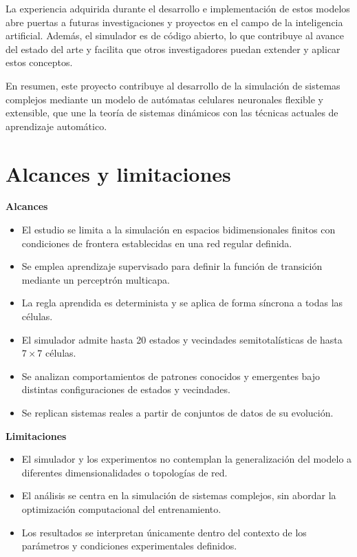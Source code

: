 La experiencia adquirida durante el desarrollo e implementación de estos modelos abre puertas a futuras investigaciones y proyectos en el campo de la inteligencia artificial. Además, el simulador es de código abierto, lo que contribuye al avance del estado del arte y facilita que otros investigadores puedan extender y aplicar estos conceptos.

En resumen, este proyecto contribuye al desarrollo de la simulación de sistemas complejos mediante un modelo de autómatas celulares neuronales flexible y extensible, que une la teoría de sistemas dinámicos con las técnicas actuales de aprendizaje automático.

\section{Alcances y limitaciones}

\textbf{Alcances}

\begin{itemize}
	
	\item El estudio se limita a la simulación en espacios bidimensionales finitos con condiciones de frontera establecidas en una red regular definida.
	
	\item Se emplea aprendizaje supervisado para definir la función de transición mediante un perceptrón multicapa.
	
	\item La regla aprendida es determinista y se aplica de forma síncrona a todas las células.
	
	\item El simulador admite hasta 20 estados y vecindades semitotalísticas de hasta $7 \times 7$ células.
	
	\item Se analizan comportamientos de patrones conocidos y emergentes bajo distintas configuraciones de estados y vecindades.
	
	\item Se replican sistemas reales a partir de conjuntos de datos de su evolución.
	
\end{itemize}

\textbf{Limitaciones}

\begin{itemize}
	
	\item El simulador y los experimentos no contemplan la generalización del modelo a diferentes dimensionalidades o topologías de red.
	
	\item El análisis se centra en la simulación de sistemas complejos, sin abordar la optimización computacional del entrenamiento.
	
	\item Los resultados se interpretan únicamente dentro del contexto de los parámetros y condiciones experimentales definidos.
	
\end{itemize}

